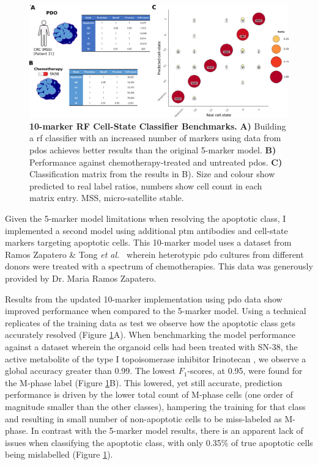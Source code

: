 \begin{figure}
    \centering
    \includegraphics{03cytof/figs/3CLASS_10m.png}
    \caption{\textbf{10-marker RF Cell-State Classifier Benchmarks.} \textbf{A)} Building a \acrshort{rf} classifier with an increased number of markers using data from \acrshort{pdo}s achieves better results than the original 5-marker model. \textbf{B)} Performance against chemotherapy-treated and untreated \acrshort{pdo}s. \textbf{C)} Classification matrix from the results in B). Size and colour show predicted to real label ratios, numbers show cell count in each matrix entry. MSS, micro-satellite stable.}
    \label{fig:3class10m}
\end{figure}

Given the 5-marker model limitations when resolving the apoptotic class, I implemented a second model using additional \acrshort{ptm} antibodies and cell-state markers targeting apoptotic cells. This 10-marker model uses a dataset from Ramos Zapatero \& Tong \emph{et al.}~\cite{zapatero_trellis_2023} wherein heterotypic \acrfull{pdo} cultures from different donors were treated with a spectrum of chemotherapies. This data was generously provided by Dr. Maria Ramos Zapatero.

Results from the updated 10-marker implementation using \acrshort{pdo} data show improved performance when compared to the 5-marker model. Using a technical replicates of the training data as test we observe how the apoptotic class gets accurately resolved (Figure \ref{fig:3class10m}A). When benchmarking the model performance against a dataset wherein the organoid cells had been treated with SN-38, the active metabolite of the type I topoisomerase inhibitor Irinotecan \cite{mathijssen_clinical_2001}, we observe a global accuracy greater than 0.99. The lowest $F_1$-scores, at 0.95, were found for the M-phase label (Figure \ref{fig:3class10m}B). This lowered, yet still accurate, prediction performance is driven by the lower total count of M-phase cells (one order of magnitude smaller than the other classes), hampering the training for that class and resulting in small number of non-apoptotic cells to be miss-labeled as M-phase.
In contrast with the 5-marker model results, there is an apparent lack of issues when classifying the apoptotic class, with only 0.35\% of true apoptotic cells being mislabelled (Figure \ref{fig:3class10m}).

